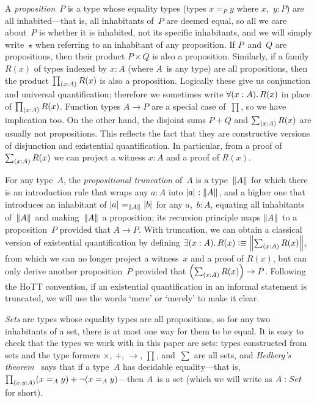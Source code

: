 \documentclass[a4paper,UKenglish,numberwithinsect,cleveref,thm-restate,draft]{lipics-v2021}
\numberwithin{equation}{section}
\theoremstyle{definition}
\theoremstyle{plain}
\begin{document}
A \emph{proposition}~$P$ is a type whose equality types (types $x =_P y$ where $x$,~$y : P$) are all inhabited---that is, all inhabitants of~$P$ are deemed equal, so all we care about~$P$ is whether it is inhabited, not its specific inhabitants, and we will simply write~$\star$ when referring to an inhabitant of any proposition.
If $P$~and~$Q$ are propositions, then their product $P \times Q$ is also a proposition.
Similarly, if a family $R(x)$ of types indexed by $x : A$ (where $A$~is any type) are all propositions, then the product $\prd{x : A} R(x)$ is also a proposition.
Logically these give us conjunction and universal quantification; therefore we sometimes write $\fall{x : A} R(x)$ in place of $\prd{x : A} R(x)$.
Function types $A \to P$ are a special case of~$\prod$, so we have implication too.
On the other hand, the disjoint sums $P + Q$ and $\sm{x : A} R(x)$ are usually not propositions.
This reflects the fact that they are constructive versions of disjunction and existential quantification.
In particular, from a proof of $\sm{x : A} R(x)$ we can project a witness $x : A$ and a proof of $R(x)$.

For any type~$A$, the \emph{propositional truncation} of~$A$ is a type~$\mathopen{}\left\Vert A\right\Vert_{}\mathclose{}$ for which there is an introduction rule that wraps any $a : A$ into $\mathopen{}\left|a\right|_{}^{}\mathclose{} : \mathopen{}\left\Vert A\right\Vert_{}\mathclose{}$, and a higher one that introduces an inhabitant of $\mathopen{}\left|a\right|_{}^{}\mathclose{} =_{\mathopen{}\left\Vert A\right\Vert_{}\mathclose{}} \mathopen{}\left|b\right|_{}^{}\mathclose{}$ for any $a$,~$b : A$, equating all inhabitants of~$\mathopen{}\left\Vert A\right\Vert_{}\mathclose{}$ and making~$\mathopen{}\left\Vert A\right\Vert_{}\mathclose{}$ a proposition; its recursion principle maps $\mathopen{}\left\Vert A\right\Vert_{}\mathclose{}$ to a proposition~$P$ provided that $A \to P$.
With truncation, we can obtain a classical version of existential quantification by defining $\exis{x : A} R(x) \defeq \brck{\sm{x : A} R(x)}$, from which we can no longer project a witness~$x$ and a proof of $R(x)$, but can only derive another proposition~$P$ provided that $\left(\sm{x : A} R(x)\right) \to P$.
Following the HoTT convention, if an existential quantification in an informal statement is truncated, we will use the words `mere' or `merely' to make it clear.

\emph{Sets} are types whose equality types are all propositions, so for any two inhabitants of a set, there is at most one way for them to be equal.
It is easy to check that the types we work with in this paper are sets: types constructed from sets and the type formers $\times$, $+$, $\to$, $\prod$, and~$\sum$ are all sets, and \emph{Hedberg's theorem}~\cite[Section~7.2]{hottbook} says that if a type~$A$ has decidable equality---that is, $\prd{x, y : A} (x =_A y) + \neg(x =_A y)$---then $A$~is a set (which we will write as $A : \set$ for short).
\end{document}
